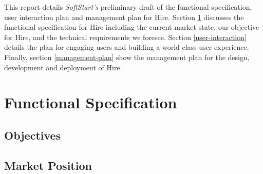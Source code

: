 \documentclass[11pt]{article}
\begin{document}

This report details \textit{SoftStart's} preliminary draft of the functional specification, user interaction plan and management plan for Hire. Section \ref{functional-spec} discusses the functional specification for Hire including the current market state, our objective for Hire, and the technical requirements we foresee. Section \ref{user-interaction} details the plan for engaging users and building a world class user experience. Finally, section \ref{management-plan} show the management plan for the design, development and deployment of Hire.

%
\section{Functional Specification}\label{functional-spec}



\subsection{Objectives}


\subsection{Market Position}
\end{document}
